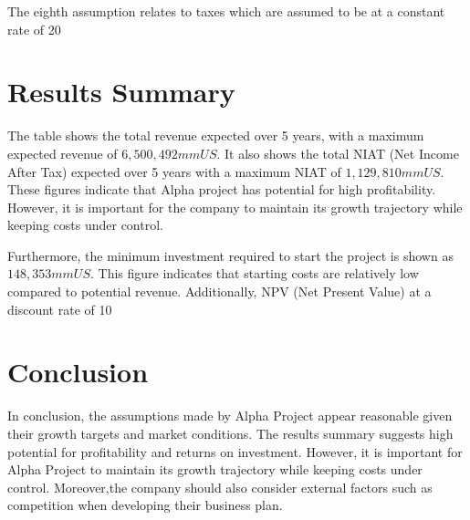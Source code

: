 The eighth assumption relates to taxes which are assumed to be at a constant rate of 20%

\section*{Results Summary}
The table shows the total revenue expected over 5 years, with a maximum expected revenue of $6,500,492mm US$. It also shows the total NIAT (Net Income After Tax) expected over 5 years with a maximum NIAT of $1,129,810mm US$. These figures indicate that Alpha project has potential for high profitability. However, it is important for the company to maintain its growth trajectory while keeping costs under control.

Furthermore, the minimum investment required to start the project is shown as $148,353mm US$. This figure indicates that starting costs are relatively low compared to potential revenue. Additionally, NPV (Net Present Value) at a discount rate of 10%

\section*{Conclusion}
In conclusion, the assumptions made by Alpha Project appear reasonable given their growth targets and market conditions. The results summary suggests high potential for profitability and returns on investment. However, it is important for Alpha Project to maintain its growth trajectory while keeping costs under control. Moreover,the company should also consider external factors such as competition when developing their business plan.